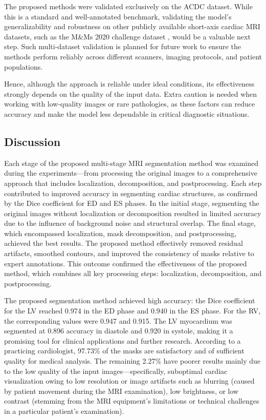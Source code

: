 \documentclass[fleqn,10pt]{wlscirep}
\begin{document}
The proposed methods were validated exclusively on the ACDC dataset. While this is a standard and well-annotated benchmark, validating the model's generalizability and robustness on other publicly available short-axis cardiac MRI datasets, such as the M\&Ms 2020 challenge dataset \cite{Campello:2021}, would be a valuable next step. Such multi-dataset validation is planned for future work to ensure the methods perform reliably across different scanners, imaging protocols, and patient populations.

Hence, although the approach is reliable under ideal conditions, its effectiveness strongly depends on the quality of the input data. Extra caution is needed when working with low-quality images or rare pathologies, as these factors can reduce accuracy and make the model less dependable in critical diagnostic situations.

\subsection*{Discussion}

Each stage of the proposed multi-stage MRI segmentation method was examined during the experiments—from processing the original images to a comprehensive approach that includes localization, decomposition, and postprocessing. Each step contributed to improved accuracy in segmenting cardiac structures, as confirmed by the Dice coefficient for ED and ES phases. In the initial stage, segmenting the original images without localization or decomposition resulted in limited accuracy due to the influence of background noise and structural overlap. The final stage, which encompassed localization, mask decomposition, and postprocessing, achieved the best results. The proposed method effectively removed residual artifacts, smoothed contours, and improved the consistency of masks relative to expert annotations. This outcome confirmed the effectiveness of the proposed method, which combines all key processing steps: localization, decomposition, and postprocessing.

The proposed segmentation method achieved high accuracy: the Dice coefficient for the LV reached 0.974 in the ED phase and 0.940 in the ES phase. For the RV, the corresponding values were 0.947 and 0.915. The LV myocardium was segmented at 0.896 accuracy in diastole and 0.920 in systole, making it a promising tool for clinical applications and further research. According to a practicing cardiologist, 97.73\% of the masks are satisfactory and of sufficient quality for medical analysis. The remaining 2.27\% have poorer results mainly due to the low quality of the input images—specifically, suboptimal cardiac visualization owing to low resolution or image artifacts such as blurring (caused by patient movement during the MRI examination), low brightness, or low contrast (stemming from the MRI equipment’s limitations or technical challenges in a particular patient’s examination).
\end{document}
